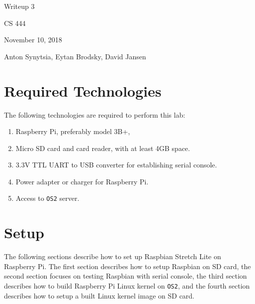 \documentclass[onecolumn, oneside, letterpaper, draftclsnofoot, 10pt]{IEEEtran}
\begin{document}
\begin{titlepage}
\begin{singlespace}
\centering
\scshape{
    \huge{Writeup 3}\par
    \vspace{.5in}
    \large{CS 444}\par
    \large{November 10, 2018}\par
    \vspace{.5in}
    \large{Anton Synytsia, Eytan Brodsky, David Jansen}\par
    \vspace{.5in}
    \vfill
}
\end{singlespace}
\end{titlepage}
\newpage
{}
\tableofcontents
\clearpage

\section{Required Technologies}
The following technologies are required to perform this lab:
\begin{enumerate}
\item Raspberry Pi, preferably model 3B+,
\item Micro SD card and card reader, with at least 4GB space.
\item 3.3V TTL UART to USB converter for establishing serial console.
\item Power adapter or charger for Raspberry Pi.
\item Access to \texttt{OS2} server.
\end{enumerate}


\section{Setup}
The following sections describe how to set up Raspbian Stretch Lite on Raspberry Pi. The first section describes how to setup Raspbian on SD card, the second section focuses on testing Raspbian with serial console, the third section describes how to build Raspberry Pi Linux kernel on \texttt{OS2}, and the fourth section describes how to setup a built Linux kernel image on SD card.
\end{document}
